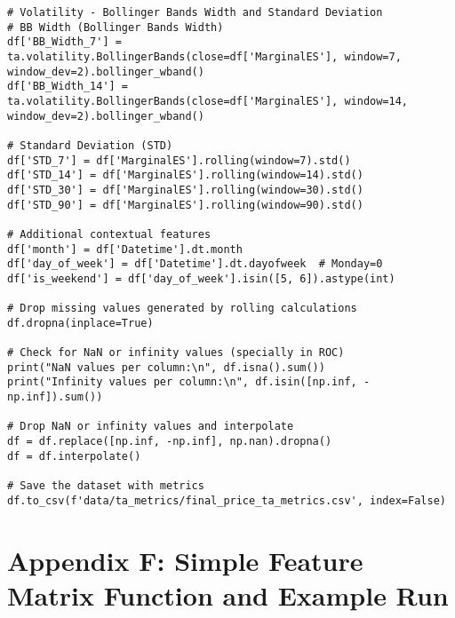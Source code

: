 \documentclass[12pt]{report} %
\begin{document}
\begin{lstlisting}
# Volatility - Bollinger Bands Width and Standard Deviation
# BB Width (Bollinger Bands Width)
df['BB_Width_7'] = ta.volatility.BollingerBands(close=df['MarginalES'], window=7, window_dev=2).bollinger_wband()
df['BB_Width_14'] = ta.volatility.BollingerBands(close=df['MarginalES'], window=14, window_dev=2).bollinger_wband()

# Standard Deviation (STD)
df['STD_7'] = df['MarginalES'].rolling(window=7).std()
df['STD_14'] = df['MarginalES'].rolling(window=14).std()
df['STD_30'] = df['MarginalES'].rolling(window=30).std()
df['STD_90'] = df['MarginalES'].rolling(window=90).std()

# Additional contextual features
df['month'] = df['Datetime'].dt.month
df['day_of_week'] = df['Datetime'].dt.dayofweek  # Monday=0
df['is_weekend'] = df['day_of_week'].isin([5, 6]).astype(int)

# Drop missing values generated by rolling calculations
df.dropna(inplace=True)

# Check for NaN or infinity values (specially in ROC)
print("NaN values per column:\n", df.isna().sum())
print("Infinity values per column:\n", df.isin([np.inf, -np.inf]).sum())

# Drop NaN or infinity values and interpolate
df = df.replace([np.inf, -np.inf], np.nan).dropna()
df = df.interpolate()

# Save the dataset with metrics
df.to_csv(f'data/ta_metrics/final_price_ta_metrics.csv', index=False)
\end{lstlisting}



\chapter* {Appendix F: Simple Feature Matrix Function and Example Run}
\label{app:appendix_f_simple_feature_matrix}
\end{document}
